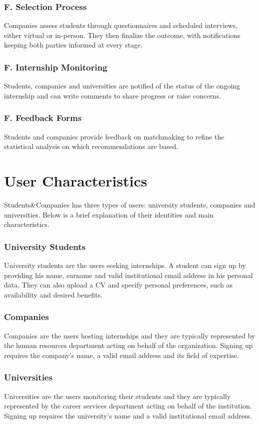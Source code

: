 \subsubsection*{F\fc. Selection Process}
Companies assess students through questionnaires and scheduled interviews, either virtual or in-person.
They then finalize the outcome, with notifications keeping both parties informed at every stage.

\subsubsection*{F\fc. Internship Monitoring}
Students, companies and universities are notified of the status of the ongoing internship and can write comments to share progress or raise concerns.

\subsubsection*{F\fc. Feedback Forms}
Students and companies provide feedback on matchmaking to refine the statistical analysis on which recommendations are based.

\section{User Characteristics}
Students\&Companies has three types of users: university students, companies and universities.
Below is a brief explanation of their identities and main characteristics.

\subsubsection{University Students}
University students are the users seeking internships.
A student can sign up by providing his name, surname and valid institutional email address in his personal data.
They can also upload a CV and specify personal preferences, such as availability and desired benefits.

\subsubsection{Companies}
Companies are the users hosting internships and they are typically represented by the human resources department acting on behalf of the organization.
Signing up requires the company's name, a valid email address and its field of expertise.

\subsubsection{Universities}
Universities are the users monitoring their students and they are typically represented by the career services department acting on behalf of the institution.
Signing up requires the university's name and a valid institutional email address.

